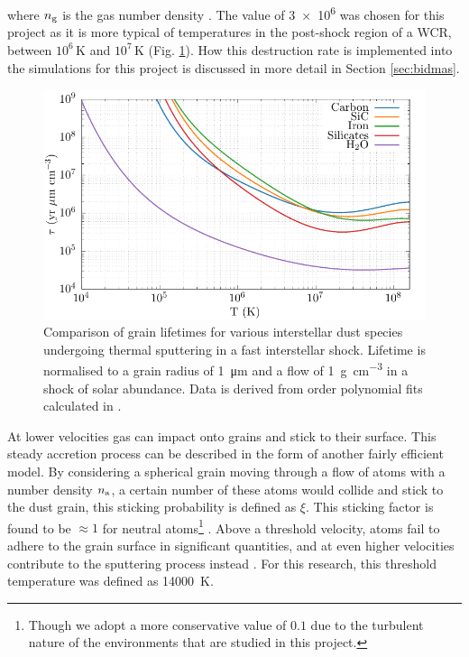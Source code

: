 \noindent
where $n_\text{g}$ is the gas number density \parencite{drainePhysicsDustGrains1979,dwekCoolingSputteringInfrared1996}.
The value of \SI{3e6}{\year} was chosen for this project as it is more typical of temperatures in the post-shock region of a WCR, between $10^6\,\si{\kelvin}$ and $10^7\,\si{\kelvin}$ (Fig. \ref{fig:grain-lifespan}).
How this destruction rate is implemented into the simulations for this project is discussed in more detail in Section \ref{sec:bidmas}.

\begin{figure}[h]
  \centering
  \includegraphics{assets/tielens-sputtering/sputter.pdf}
  \caption[Grain lifetime comparison]{Comparison of grain lifetimes for various interstellar dust species undergoing thermal sputtering in a fast interstellar shock. Lifetime is normalised to a grain radius of \SI{1}{\micro\metre} and a flow of \SI{1}{\gram\per\centi\metre\cubed} in a shock of solar abundance. Data is derived from  order polynomial fits calculated in \textcite[Table~4]{tielens_physics_1994}.}
  \label{fig:grain-lifespan}
\end{figure}

At lower velocities gas can impact onto grains and stick to their surface.
This steady accretion process can be described in the form of another fairly efficient model.
By considering a spherical grain moving through a flow of atoms with a number density $n_\text{a}$, a certain number of these atoms would collide and stick to the dust grain, this sticking probability is defined as $\xi$.
This sticking factor is found to be $\approx 1$ for neutral atoms\footnote{Though we adopt a more conservative value of $0.1$ due to the turbulent nature of the environments that are studied in this project.} \parencite{watsonAbundancesInterstellarMolecules1972}.
Above a threshold velocity, atoms fail to adhere to the grain surface in significant quantities, and at even higher velocities contribute to the sputtering process instead \parencite{spitzerPhysicalProcessesInterstellar2008}.
For this research, this threshold temperature was defined as \SI{14000}{\kelvin}.

